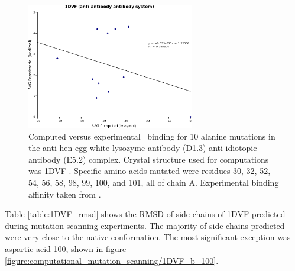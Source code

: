 \begin{figure}[h]
    \centering
    \includegraphics[width=0.65\textwidth]{figures/1dvf.png}
    \caption{Computed versus experimental \ddg\ binding for 10 alanine mutations in the anti-hen-egg-white lysozyme antibody (D1.3) anti-idiotopic antibody (E5.2) complex.
    Crystal structure used for computations was 1DVF \protect\cite{braden1996crystal}.
    Specific amino acids mutated were residues 30, 32, 52, 54, 56, 58, 98, 99, 100, and 101, all of chain A.
    Experimental binding affinity taken from \protect\cite{thorn2001asedb}.}
    \label{figure:computational_mutation_scanning/1DVF_ddg}
\end{figure}



Table \ref{table:1DVF_rmsd} shows the RMSD of side chains of 1DVF predicted during mutation scanning experiments.
The majority of side chains predicted were very close to the native conformation.
The most significant exception was aspartic acid 100, shown in figure \ref{figure:computational_mutation_scanning/1DVF_b_100}.


